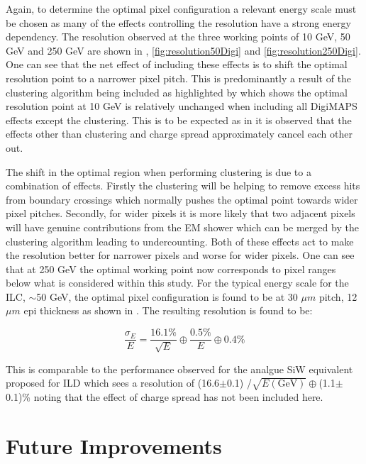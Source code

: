 Again, to determine the optimal pixel configuration a relevant energy scale must be chosen as many of the effects controlling the resolution have a strong energy dependency. The resolution observed at the three working points of 10 GeV, 50 GeV and 250 GeV are shown in , \ref{fig:resolution50Digi} and \ref{fig:resolution250Digi}. One can see that the net effect of including these effects is to shift the optimal resolution point to a narrower pixel pitch. This is predominantly a result of the clustering algorithm being included as highlighted by  which shows the optimal resolution point at 10 GeV is relatively unchanged when including all DigiMAPS effects except the clustering. This is to be expected as in  it is observed that the effects other than clustering and charge spread approximately cancel each other out.

The shift in the optimal region when performing clustering is due to a combination of effects. Firstly the clustering will be helping to remove excess hits from boundary crossings which normally pushes the optimal point towards wider pixel pitches. Secondly, for wider pixels it is more likely that two adjacent pixels will have genuine contributions from the EM shower which can be merged by the clustering algorithm leading to undercounting. Both of these effects act to make the resolution better for narrower pixels and worse for wider pixels. One can see that at 250 GeV the optimal working point now corresponds to pixel ranges below what is considered within this study. For the typical energy scale for the \ac{ILC}, $\sim$50 GeV, the optimal pixel configuration is found to be at 30 $\mu m$ pitch, 12 $\mu m$ epi thickness as shown in . The resulting resolution is found to be:

\begin{equation}
  \frac{\sigma_E}{E}=\frac{16.1\%}{\sqrt{E}} \oplus \frac{0.5\%}{E} \oplus 0.4\%
\end{equation}

This is comparable to the performance observed for the analgue SiW equivalent proposed for \ac{ILD} which sees a resolution of (16.6$\pm$0.1) /$\sqrt{E(\text{GeV})} \oplus$(1.1$\pm$0.1)\% noting that the effect of charge spread has not been included here.


\section{Future Improvements}

